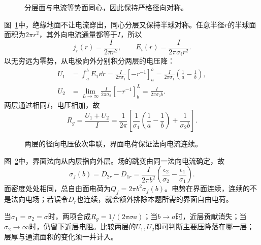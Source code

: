 \begin{figure}[H]\centering
{}
\caption{分层面与电流等势面同心，因此保持严格径向对称。}\label{fig:c1-layer-earth-q}
\end{figure}
\begin{solution}
图~\ref{fig:c1-layer-earth-q}中，绝缘地面不让电流穿出，同心分层又保持半球对称。任意半径$r$的半球面面积为$2\pi r^2$，其外向电流通量都等于$I$，所以
\[
 j_r(r)=\frac{I}{2\pi r^2},\qquad
 E_i(r)=\frac{I}{2\pi\sigma_i r^2}.
\]
以无穷远为零势，从电极向外分别积分两层的电压降：
\[
 \begin{aligned}
 U_1&=\int_a^bE_1\dd r=\frac{I}{2\pi\sigma_1}[-r^{-1}]_a^b
 =\frac{I}{2\pi\sigma_1}\left(\frac1a-\frac1b\right),\\
 U_2&=\lim_{L\to\infty}\frac{I}{2\pi\sigma_2}[-r^{-1}]_b^L
 =\frac{I}{2\pi\sigma_2b}.
 \end{aligned}
\]
两层通过相同$I$，电压相加，故
\[
 \boxed{R_g=\frac{U_1+U_2}{I}
 =\frac1{2\pi}\left[\frac1{\sigma_1}\left(\frac1a-\frac1b\right)
 +\frac1{\sigma_2b}\right]}.
\]
\begin{figure}[H]\centering
{}
\caption{两层的径向电压依次串联，界面电荷保证法向电流连续。}\label{fig:c1-layer-earth-s}
\end{figure}
图~\ref{fig:c1-layer-earth-s}中，界面法向从内层指向外层。场的跳变由同一法向电流确定，故
\[
 \boxed{\sigma_f(b)=D_{2r}-D_{1r}
 =\frac{I}{2\pi b^2}\left(\frac{\epsilon_2}{\sigma_2}
 -\frac{\epsilon_1}{\sigma_1}\right)}.
\]
面密度处处相同，总自由面电荷为$Q_f=2\pi b^2\sigma_f(b)$。电势在界面连续，连续的不是法向电场；若误令$D_r$也连续，就会额外排除本题所需的界面自由电荷。

当$\sigma_1=\sigma_2=\sigma$时，两项合成$R_g=1/(2\pi\sigma a)$；当$b\to a$时，近层贡献消失；当$\sigma_2\to\infty$时，仍留下近层电阻。比较两层的$U_1,U_2$即可判断主要压降落在哪一层；层厚与通流面积的变化须一并计入。
\end{solution}

